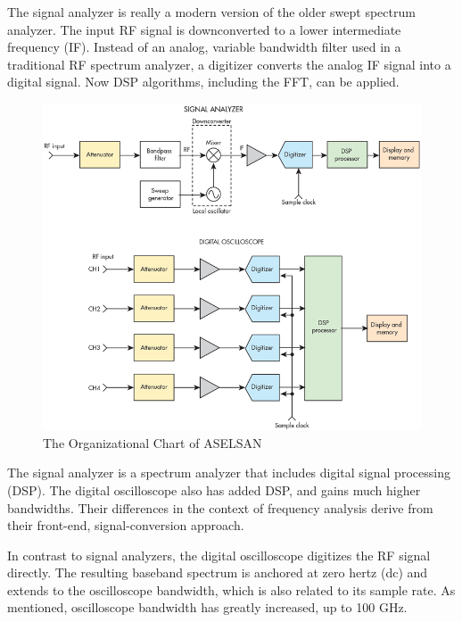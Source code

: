 	The signal analyzer is really a modern version of the older swept spectrum analyzer. The input RF signal is downconverted to a lower intermediate frequency (IF). Instead of an analog, variable bandwidth filter used in a traditional RF spectrum analyzer, a digitizer converts the analog IF signal into a digital signal. Now DSP algorithms, including the FFT, can be applied.


\begin{figure}[H]
	\center
	\setlength{\unitlength}{\textwidth} 
	\includegraphics[width=0.85\unitlength]{ansosc}
	\caption{\label{fig:ansosc}The Organizational Chart of ASELSAN }
\end{figure}

	The signal analyzer is a spectrum analyzer that includes digital signal processing (DSP). The digital oscilloscope also has added DSP, and gains much higher bandwidths. Their differences in the context of frequency analysis derive from their front-end, signal-conversion approach.

	In contrast to signal analyzers, the digital oscilloscope digitizes the RF signal directly. The resulting baseband spectrum is anchored at zero hertz (dc) and extends to the oscilloscope bandwidth, which is also related to its sample rate. As mentioned, oscilloscope bandwidth has greatly increased, up to 100 GHz.

